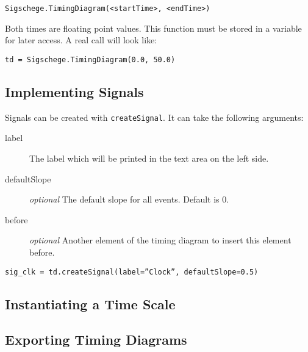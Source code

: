 \documentclass[11pt]{article}
\begin{document}
\begin{center}
  \texttt{Sigschege.TimingDiagram(<startTime>, <endTime>)}
\end{center}

Both times are floating point values.
This function must be stored in a variable for later access. A real call will
look like:

\begin{center}
  \texttt{td = Sigschege.TimingDiagram(0.0, 50.0)}
\end{center}

\subsection{Implementing Signals}
\label{sec:sig}

Signals can be created with \texttt{createSignal}. It can take the following
arguments:

\begin{description}
\item[label] The label which will be printed in the text area on the left side.
\item[defaultSlope] \emph{optional} The default slope for all events. Default is 0.
\item[before] \emph{optional} Another element of the timing diagram to insert this element before.  
\end{description}

\begin{center}
  \texttt{sig\_clk = td.createSignal(label=''Clock'', defaultSlope=0.5)}
\end{center}

\subsection{Instantiating a Time Scale}
\label{sec:tis}



\subsection{Exporting Timing Diagrams}
\label{sec:exp}
\end{document}
